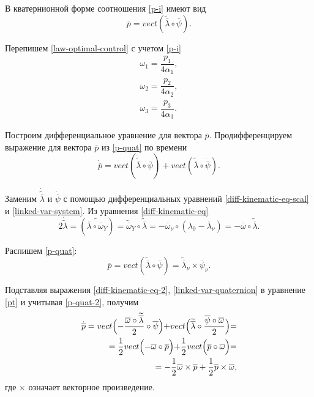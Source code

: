 \documentclass[14pt]{extreport}
\begin{document}
В кватернионной форме соотношения \eqref{p-i} имеют вид
\begin{equation}
\label{p-quat}
\overline{p} = vect(\widetilde{\overline{\lambda}} \circ \overline{\psi}).
\end{equation}

Перепишем \eqref{law-optimal-control} с учетом \eqref{p-i}
\begin{equation}
\label{law-optimal-control-2}
\begin{split}
\omega_{1} = \dfrac{p_{1}}{4\alpha_{1}},\\
\omega_{2} = \dfrac{p_{2}}{4\alpha_{2}},\\
\omega_{3} = \dfrac{p_{3}}{4\alpha_{3}}.
\end{split}
\end{equation}

Построим дифференциальное уравнение для вектора $\overline{p}$. Продиффе­ренцируем выражение для вектора $\overline{p}$ из \eqref{p-quat} по времени
\begin{equation}
\label{pt}
\dot{\overline{p}}=vect(\dot{\widetilde{\overline{\lambda}}} \circ \overline{\psi})+vect(\widetilde{\overline{\lambda}} \circ \dot{\overline{\psi}}).
\end{equation}

Заменим $\dot{\widetilde{\overline{\lambda}}}$ и $\dot{\overline{\psi}}$ с помощью дифференциальных уравнений \eqref{diff-kinematic-eq-scal} и \eqref{linked-var-system}. Из уравнения \eqref{diff-kinematic-eq}
\begin{equation}
\label{diff-kinematic-eq-2}
2\dot{\widetilde{\lambda}}=(\widetilde{\overline{\lambda} \circ \overline{\omega}_Y})=\widetilde{\overline{\omega}}_Y \circ \widetilde{\overline{\lambda}}
=-\overline{\omega}_{\nu} \circ (\lambda_0-\overline{\lambda}_{\nu}) =-\overline{\omega} \circ \widetilde{\overline{\lambda}}.
\end{equation}

Распишем \eqref{p-quat}: 
\begin{equation}
\label{p-quat-2}
\overline{p}=vect(\widetilde{\overline{\lambda}} \circ \overline{\psi})=\widetilde{\overline{\lambda}}_{\nu} \times \overline{\psi}_{\nu}.
\end{equation}

Подставляя выражения \eqref{diff-kinematic-eq-2}, \eqref{linked-var-quaternion} в уравнение \eqref{pt} и учитывая \eqref{p-quat-2}, получим
\begin{equation}
\label{pt-2}
\begin{split}
\dot{\overline{p}}=vect\Bigl(-\dfrac{\overline{\omega} \circ \widetilde{\overline{\lambda}}}{2} \circ \overline{\psi}\Bigl)+
vect\Bigl(\widetilde{\overline{\lambda}} \circ \dfrac{\overline{\psi} \circ \overline{\omega}}{2}\Bigl)=\\
=\dfrac{1}{2} vect\Bigl(-\overline{\omega} \circ \overline{p} \Bigl)+
\dfrac{1}{2} vect\Bigl(\overline{p} \circ \overline{\omega}  \Bigl)=\\
=-\dfrac{1}{2} \overline{\omega} \times \overline{p}+
\dfrac{1}{2} \overline{p} \times \overline{\omega},
\end{split}
\end{equation}
где $\times$ означает векторное произведение.
\end{document}
